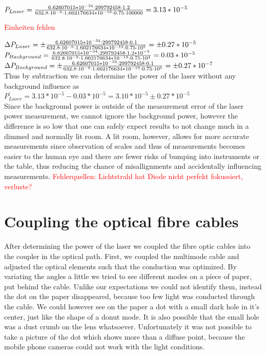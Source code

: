 \documentclass{article}
\begin{document}
$P_{Laser} =  \frac{6.62607015*10^{-34}\cdot299792458\cdot1.2}{632.8\cdot10^{-9}\cdot1.602176634*10^{-19}\cdot0.75\cdot100000}=3.13*10^{-5} \vspace{2cm}$

\textcolor{red}{Einheiten fehlen}

$\Delta P_{Laser}= \pm \frac{6.62607015*10^{-34}\cdot299792458\cdot0.1}{632.8\cdot10^{-9}\cdot1.602176634*10^{-19}\cdot0.75\cdot10^{5}} =\pm 0.27*10^{-5} \vspace{2cm}$\\

$P_{Background} =  \frac{6.62607015*10^{-34}\cdot299792458\cdot1.2*10^{-3}}{632.8\cdot10^{-9}\cdot1.602176634*10^{-19}\cdot0.75\cdot10^{4}}=0.03*10^{-5} \vspace{2cm}$\\

$\Delta P_{Background} = \pm \frac{6.62607015*10^{-34}\cdot299792458\cdot0.1}{632.8\cdot10^{-9}\cdot1.602176634*10^{-19}\cdot0.75\cdot10^{5}} =\pm 0.27*10^{-7} \vspace{2cm}$\\

Thus by subtraction we can determine the power of the laser without any background influence as\\

$P^{'}_{Laser} = 3.13*10^{-5}- 0.03*10^{-5} =3.10*10^{-5} \pm 0.27*10^{-5}$\\

Since the background power is outside of the measurement error of
the laser power measurement, we cannot ignore the background power, however the difference is so low that one can safely expect results to not change much in a dimmed and normally lit room. A lit room, however, allows for more accurate measurements since observation of scales and thus of measurements becomes easier to the human eye and there are fewer risks of bumping into instruments or the table, thus reducing the chance of misallignments and accidentally influencing measurements.
\textcolor{red}{Fehlerquellen: Lichtstrahl hat Diode nicht perfekt fokussiert, verluste?}

\section{Coupling the optical fibre cables}

After determining the power of the laser we coupled the fibre optic cables into the coupler in the optical path. First, we coupled the multimode cable and adjusted the optical elements such that the conduction was optimized. By variating the angles a little we tried to see different modes on a piece of paper, put behind the cable. Unlike our expectations we could not identify them, instead the dot on the paper disappeared, because too few light was conducted through the cable. We could however see on the paper a dot with a small dark hole in it's center, just like the shape of a donut mode. It is also possible that the small hole was a dust crumb on the lens whatsoever. Unfortunately it was not possible to take a picture of the dot which shows more than a diffuse point, because the mobile phone cameras could not work with the light conditions.\\
\end{document}
